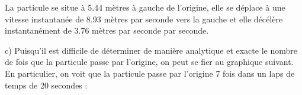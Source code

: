 La particule se situe à 5.44 mètres à gauche de l'origine, elle se déplace à
une vitesse instantanée de 8.93 mètres par seconde vers la gauche et elle
décélère instantanément de 3.76 mètres par seconde par seconde.
\vspace{5mm}

c) Puisqu'il est difficile de déterminer de manière analytique et exacte le
nombre de fois que la particule passe par l'origine, on peut se fier au
graphique suivant. En particulier, on voit que la particule passe par l'origine
7 fois dans un laps de temps de 20 secondes :
\begin{center}
\end{center}
